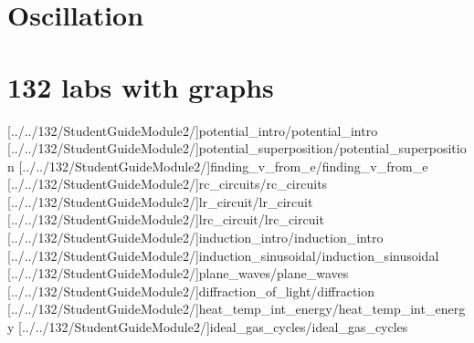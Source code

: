 \documentclass[english,twoside]{article}
\begin{document}


\part{Oscillation}




\part{132 labs with graphs}

[../../132/StudentGuideModule2/]{potential_intro/potential_intro}
[../../132/StudentGuideModule2/]{potential_superposition/potential_superposition}
[../../132/StudentGuideModule2/]{finding_v_from_e/finding_v_from_e}
[../../132/StudentGuideModule2/]{rc_circuits/rc_circuits}
[../../132/StudentGuideModule2/]{lr_circuit/lr_circuit} %
[../../132/StudentGuideModule2/]{lrc_circuit/lrc_circuit} %
[../../132/StudentGuideModule2/]{induction_intro/induction_intro}
[../../132/StudentGuideModule2/]{induction_sinusoidal/induction_sinusoidal}
[../../132/StudentGuideModule2/]{plane_waves/plane_waves}
[../../132/StudentGuideModule2/]{diffraction_of_light/diffraction}
[../../132/StudentGuideModule2/]{heat_temp_int_energy/heat_temp_int_energy}
[../../132/StudentGuideModule2/]{ideal_gas_cycles/ideal_gas_cycles}
\end{document}
